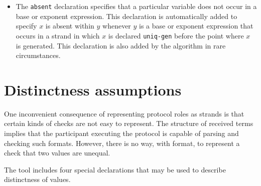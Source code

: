 \begin{itemize}

  \item {} The \texttt{absent} declaration specifies
    that a particular  variable does not occur in a base or
    exponent expression.  This declaration is automatically added to
    specify $x$ is absent within $y$ whenever $y$ is a base or
    exponent expression that occurs in a strand in which $x$ is
    declared \texttt{uniq-gen} before the point where $x$ is
    generated.  This declaration is also added by the algorithm in
    rare circumstances.
\end{itemize}

\iffalse

\section{Distinctness assumptions}
\label{sec:distinct_decls}

One inconvenient consequence of representing protocol roles as strands
is that certain kinds of checks are not easy to represent.  The
structure of received terms implies that the participant executing the
protocol is capable of parsing and checking such formats.  However,
there is no way, with format, to represent a check that two values are
unequal.

The tool includes four special declarations that may be used to
describe distinctness of values.


